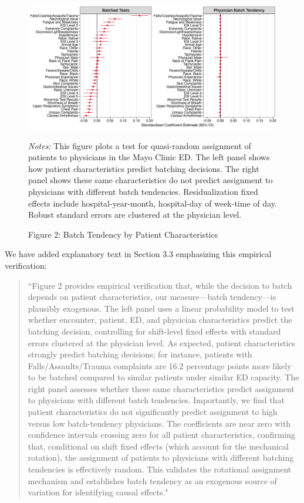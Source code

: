\documentclass[11pt]{article}
\newcommand{\1}{\hbox{\rm 1\kern-.35em 1}}
\begin{document}
\begin{figure}[H]
\centering
\caption*{Figure 2: Batch Tendency by Patient Characteristics}
\begin{threeparttable}
\includegraphics[width=\textwidth]{../outputs/figures/fig2_panel_batched_standardized.png}
    \begin{tablenotes}
        \small
        \item \textit{Notes:} This figure plots a test for quasi-random assignment of patients to physicians in the Mayo Clinic ED. The left panel shows how patient characteristics predict batching decisions. The right panel shows these same characteristics do not predict assignment to physicians with different batch tendencies. Residualization fixed effects include hospital-year-month, hospital-day of week-time of day. Robust standard errors are clustered at the physician level.
    \end{tablenotes}
\end{threeparttable}
\end{figure}

We have added explanatory text in Section 3.3 emphasizing this empirical verification:

\begin{quote}
``Figure 2 provides empirical verification that, while the decision to batch depends on patient characteristics, our measure—batch tendency—is plausibly exogenous. The left panel uses a linear probability model to test whether encounter, patient, ED, and physician characteristics predict the batching decision, controlling for shift-level fixed effects with standard errors clustered at the physician level. As expected, patient characteristics strongly predict batching decisions; for instance, patients with Falls/Assaults/Trauma complaints are 16.2 percentage points more likely to be batched compared to similar patients under similar ED capacity. The right panel assesses whether these same characteristics predict assignment to physicians with different batch tendencies. Importantly, we find that patient characteristics do not significantly predict assignment to high versus low batch-tendency physicians. The coefficients are near zero with confidence intervals crossing zero for all patient characteristics, confirming that, conditional on shift fixed effects (which account for the mechanical rotation), the assignment of patients to physicians with different batching tendencies is effectively random. This validates the rotational assignment mechanism and establishes batch tendency as an exogenous source of variation for identifying causal effects."
\end{quote}
\end{document}

